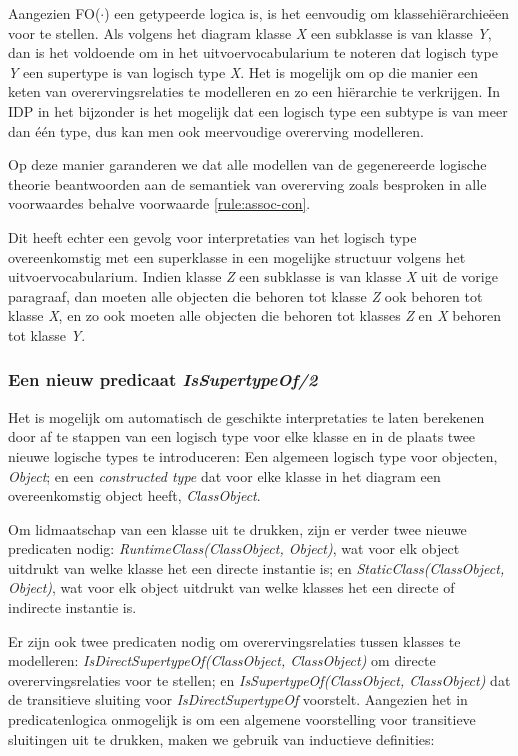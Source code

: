 Aangezien FO($\cdot$) een getypeerde logica is, is het eenvoudig om klassehi\"erarchie\"een voor te stellen. Als volgens het diagram klasse \textit{X} een subklasse is van klasse \textit{Y}, dan is het voldoende om in het uitvoervocabularium te noteren dat logisch type \textit{Y} een supertype is van logisch type \textit{X}. Het is mogelijk om op die manier een keten van overervingsrelaties te modelleren en zo een hi\"erarchie te verkrijgen. In IDP in het bijzonder is het mogelijk dat een logisch type een subtype is van meer dan \'e\'en type, dus kan men ook meervoudige overerving modelleren.

Op deze manier garanderen we dat alle modellen van de gegenereerde logische theorie beantwoorden aan de semantiek van overerving zoals besproken in alle voorwaardes behalve voorwaarde \ref{rule:assoc-con}.

Dit heeft echter een gevolg voor interpretaties van het logisch type overeenkomstig met een superklasse in een mogelijke structuur volgens het uitvoervocabularium. Indien klasse \textit{Z} een subklasse is van klasse \textit{X} uit de vorige paragraaf, dan moeten alle objecten die behoren tot klasse \textit{Z} ook behoren tot klasse \textit{X}, en zo ook moeten alle objecten die behoren tot klasses \textit{Z} en \textit{X} behoren tot klasse \textit{Y}.

\subsubsection{Een nieuw predicaat \textit{IsSupertypeOf/2}}

Het is mogelijk om automatisch de geschikte interpretaties te laten berekenen door af te stappen van een logisch type voor elke klasse en in de plaats twee nieuwe logische types te introduceren: Een algemeen logisch type voor objecten, \textit{Object}; en een \textit{constructed type}\cite{DeCatBroes2014PLaa} dat voor elke klasse in het diagram een overeenkomstig object heeft, \textit{ClassObject}.

Om lidmaatschap van een klasse uit te drukken, zijn er verder twee nieuwe predicaten nodig: \textit{RuntimeClass(ClassObject, Object)}, wat voor elk object uitdrukt van welke klasse het een directe instantie is; en \textit{StaticClass(ClassObject, Object)}, wat voor elk object uitdrukt van welke klasses het een directe of indirecte instantie is.

Er zijn ook twee predicaten nodig om overervingsrelaties tussen klasses te modelleren: \textit{IsDirectSupertypeOf(ClassObject, ClassObject)} om directe overervingsrelaties voor te stellen; en \textit{IsSupertypeOf(ClassObject, ClassObject)} dat de transitieve sluiting voor \textit{IsDirectSupertypeOf} voorstelt. Aangezien het in predicatenlogica onmogelijk is om een algemene voorstelling voor transitieve sluitingen uit te drukken, maken we gebruik van inductieve definities\cite{DeCatBroes2014PLaa}:

